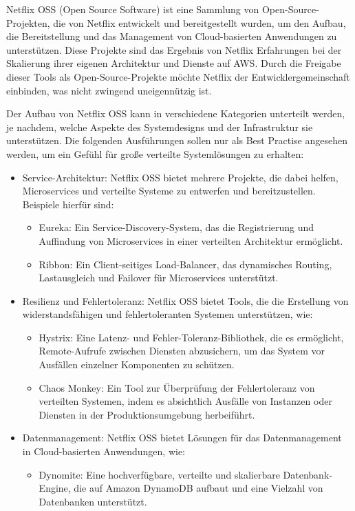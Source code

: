 Netflix OSS (Open Source Software) ist eine Sammlung von Open-Source-Projekten, die von Netflix entwickelt und bereitgestellt wurden, um den Aufbau, die Bereitstellung und das Management von Cloud-basierten Anwendungen zu unterstützen. Diese Projekte sind das Ergebnis von Netflix Erfahrungen bei der Skalierung ihrer eigenen Architektur und Dienste auf AWS. Durch die Freigabe dieser Tools als Open-Source-Projekte möchte Netflix der Entwicklergemeinschaft einbinden, was nicht zwingend uneigennützig ist.

Der Aufbau von Netflix OSS kann in verschiedene Kategorien unterteilt werden, je nachdem, welche Aspekte des Systemdesigns und der Infrastruktur sie unterstützen. Die folgenden Ausführungen sollen nur als Best Practise angesehen werden, um ein Gefühl für große verteilte Systemlösungen zu erhalten:
\begin{itemize}
\item Service-Architektur: Netflix OSS bietet mehrere Projekte, die dabei helfen, Microservices und verteilte Systeme zu entwerfen und bereitzustellen. Beispiele hierfür sind:
\begin{itemize}
\item Eureka: Ein Service-Discovery-System, das die Registrierung und Auffindung von Microservices in einer verteilten Architektur ermöglicht.
\item Ribbon: Ein Client-seitiges Load-Balancer, das dynamisches Routing, Lastausgleich und Failover für Microservices unterstützt.
\end{itemize}
\item Resilienz und Fehlertoleranz: Netflix OSS bietet Tools, die die Erstellung von widerstandsfähigen und fehlertoleranten Systemen unterstützen, wie:
\begin{itemize}
\item Hystrix: Eine Latenz- und Fehler-Toleranz-Bibliothek, die es ermöglicht, Remote-Aufrufe zwischen Diensten abzusichern, um das System vor Ausfällen einzelner Komponenten zu schützen.
\item Chaos Monkey: Ein Tool zur Überprüfung der Fehlertoleranz von verteilten Systemen, indem es absichtlich Ausfälle von Instanzen oder Diensten in der Produktionsumgebung herbeiführt.
\end{itemize}
\item Datenmanagement: Netflix OSS bietet Lösungen für das Datenmanagement in Cloud-basierten Anwendungen, wie:
\begin{itemize}
\item Dynomite: Eine hochverfügbare, verteilte und skalierbare Datenbank-Engine, die auf Amazon DynamoDB aufbaut und eine Vielzahl von Datenbanken unterstützt.

\end{itemize}
\end{itemize}
